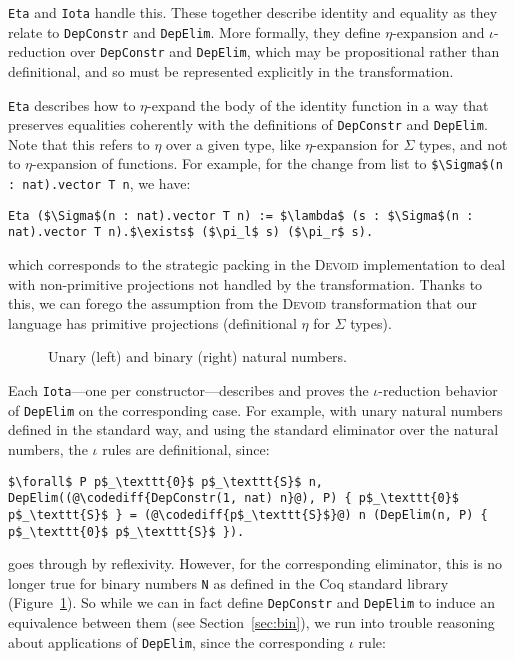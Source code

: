 \lstinline{Eta} and \lstinline{Iota} handle this.
These together describe identity and equality as they relate to \lstinline{DepConstr} and \lstinline{DepElim}.
More formally, they define $\eta$-expansion and $\iota$-reduction over \lstinline{DepConstr} and \lstinline{DepElim},
which may be propositional rather than definitional, and so must be represented explicitly in the transformation.

\lstinline{Eta} describes how to $\eta$-expand the body of the identity function in a way that preserves equalities
coherently with the definitions of \lstinline{DepConstr} and \lstinline{DepElim}.
Note that this refers to $\eta$ over a given type, like $\eta$-expansion for $\Sigma$ types, and not to $\eta$-expansion of functions.
For example, for the change from list to \lstinline{$\Sigma$(n : nat).vector T n}, we have:

\begin{lstlisting}
Eta ($\Sigma$(n : nat).vector T n) := $\lambda$ (s : $\Sigma$(n : nat).vector T n).$\exists$ ($\pi_l$ s) ($\pi_r$ s).
\end{lstlisting}
which corresponds to the strategic packing in the \textsc{Devoid} implementation to deal with
non-primitive projections not handled by the transformation. Thanks to this, we can forego the assumption from the \textsc{Devoid} transformation
that our language has primitive projections (definitional $\eta$ for $\Sigma$ types).

\begin{figure}
\begin{minipage}{0.48\textwidth}
   
\end{minipage}
\hfill
\begin{minipage}{0.48\textwidth}
   
\end{minipage}
\caption{Unary (left) and binary (right) natural numbers.}
\label{fig:nattobin}
\end{figure}

Each \lstinline{Iota}---one per constructor---describes and proves the $\iota$-reduction behavior
of \lstinline{DepElim} on the corresponding case. For example, with unary natural numbers defined in the standard way,
and using the standard eliminator over the natural numbers, the $\iota$ rules are definitional, since:

\begin{lstlisting}
$\forall$ P p$_\texttt{0}$ p$_\texttt{S}$ n, DepElim((@\codediff{DepConstr(1, nat) n}@), P) { p$_\texttt{0}$ p$_\texttt{S}$ } = (@\codediff{p$_\texttt{S}$}@) n (DepElim(n, P) { p$_\texttt{0}$ p$_\texttt{S}$ }).
\end{lstlisting}
goes through by reflexivity.
However, for the corresponding eliminator, this is no longer true for binary numbers \lstinline{N} as defined in the Coq standard library (Figure~\ref{fig:nattobin}).
So while we can in fact define \lstinline{DepConstr} and \lstinline{DepElim} to induce an equivalence
between them (see Section~\ref{sec:bin}), we run into trouble reasoning about applications of \lstinline{DepElim},
since the corresponding $\iota$ rule:

